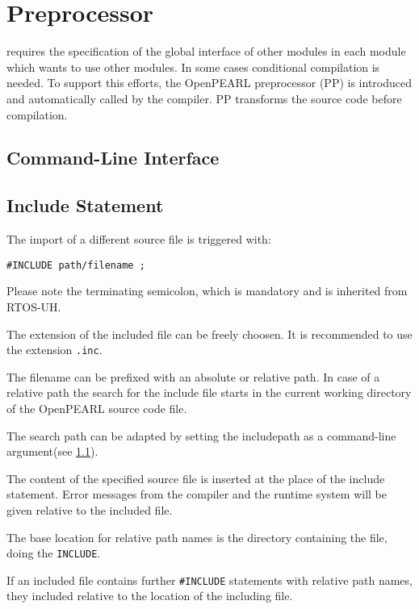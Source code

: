 \chapter{Preprocessor}

\OpenPEARL{} requires the specification of the global interface of
other modules in each module which wants to use other modules.  In
some cases conditional compilation is needed.  To support this
efforts, the OpenPEARL{} preprocessor (PP) is introduced and
automatically called by the compiler. PP transforms the source code
before compilation.

\section{Command-Line Interface}
\label{sec:commandline_interface}

\section{Include Statement}

The import of a different source file is triggered with:
\\
\begin{lstlisting}
#INCLUDE path/filename ;
\end{lstlisting}

Please note the terminating semicolon, which is mandatory and is
inherited from RTOS-UH.

The extension of the included file can be freely choosen. It is
recommended to use the extension \texttt{.inc}.

The filename can be prefixed with an absolute or relative path.  In
case of a relative path the search for the include file starts in the
current working directory of the OpenPEARL{} source code file.

The search path can be adapted by setting the includepath as a
command-line argument(see \ref{sec:commandline_interface}).

The content of the specified source file is inserted at the place of
the include statement. Error messages from the compiler and the
runtime system will be given relative to the included file.

The base location for relative path names is the directory containing
the file, doing the \texttt{INCLUDE}.

If an included file contains further \texttt{\#INCLUDE} statements
with relative path names, they included relative to the location of
the including file.

